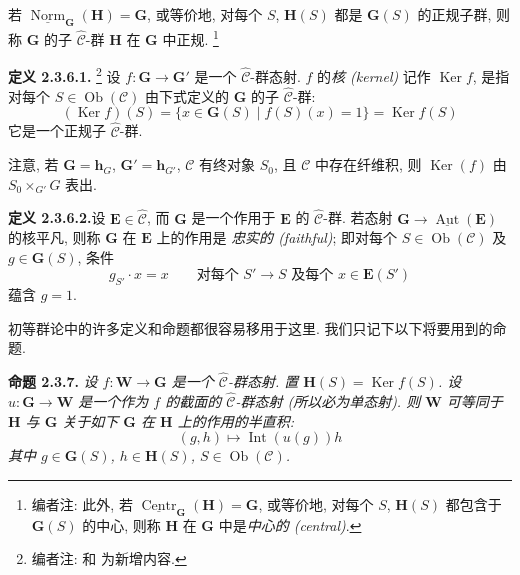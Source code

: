 若 \(\underline{\operatorname{Norm}}_{\mathbf G}(\mathbf H)=\mathbf G\),
或等价地, 对每个 \(S\), \(\mathbf H(S)\) 都是 \(\mathbf G(S)\)
的正规子群, 则称 \(\mathbf G\) 的子 \(\widehat{\mathscr C}\)-群
\(\mathbf H\) 在 \(\mathbf G\) 中正规.
\footnote{编者注: 此外, 若
\(\underline{\operatorname{Centr}}_{\mathbf G}(\mathbf H)=\mathbf G\),
或等价地, 对每个 \(S\), \(\mathbf H(S)\) 都包含于 \(\mathbf G(S)\)
的中心, 则称 \(\mathbf H\) 在 \(\mathbf G\) 中是\emph{中心的 (central)}.}

\medskip
\noindent{}\textbf{定义 2.3.6.1.}
\footnote{编者注:  和
 为新增内容.}
设 \(f:\mathbf G\to\mathbf G'\) 是一个 \(\widehat{\mathscr C}\)-群态射.
\(f\) 的\emph{核 (kernel)} 记作 \(\operatorname{Ker}f\), 是指对每个
\(S\in\operatorname{Ob}(\mathscr C)\) 由下式定义的 \(\mathbf G\)
的子 \(\widehat{\mathscr C}\)-群:
\[
  (\operatorname{Ker}f)(S)
    =\{x\in\mathbf G(S)\mid f(S)(x)=1\}
    =\operatorname{Ker}f(S)
\]
它是一个正规子 \(\widehat{\mathscr C}\)-群.

注意, 若 \(\mathbf G=\mathbf h_G\),
\(\mathbf G'=\mathbf h_{G'}\), \(\mathscr C\) 有终对象
\(S_0\), 且 \(\mathscr C\) 中存在纤维积, 则
\(\operatorname{Ker}(f)\) 由 \(S_0\times_{G'}G\) 表出.

\medskip
\noindent{}\textbf{定义 2.3.6.2.}\footnotemark[\value{footnote}]
设 \(\mathbf E\in\widehat{\mathscr C}\), 而 \(\mathbf G\) 是一个作用于
\(\mathbf E\) 的 \(\widehat{\mathscr C}\)-群.
若态射 \(\mathbf G\to\underline{\operatorname{Aut}}(\mathbf E)\)
的核平凡, 则称 \(\mathbf G\) 在 \(\mathbf E\) 上的作用是
\emph{忠实的 (faithful)}; 即对每个
\(S\in\operatorname{Ob}(\mathscr C)\) 及 \(g\in\mathbf G(S)\), 条件
\[
  g_{S'}\cdot x=x
  \qquad
  \text{对每个 }S'\to S\text{ 及每个 }x\in\mathbf E(S')
\]
蕴含 \(g=1\).

初等群论中的许多定义和命题都很容易移用于这里.
我们只记下以下将要用到的命题.

\medskip
\noindent{}\textbf{命题 2.3.7.}
\textit{设 \(f:\mathbf W\to\mathbf G\) 是一个
\(\widehat{\mathscr C}\)-群态射. 置
\(\mathbf H(S)=\operatorname{Ker}f(S)\). 设
\(u:\mathbf G\to\mathbf W\) 是一个作为 \(f\) 的截面的
\(\widehat{\mathscr C}\)-群态射 (所以必为单态射).
则 \(\mathbf W\) 可等同于 \(\mathbf H\) 与 \(\mathbf G\)
关于如下 \(\mathbf G\) 在 \(\mathbf H\) 上的作用的半直积:
\[
  (g,h)\longmapsto\operatorname{Int}(u(g))h
\]
其中 \(g\in\mathbf G(S)\), \(h\in\mathbf H(S)\),
\(S\in\operatorname{Ob}(\mathscr C)\).}

